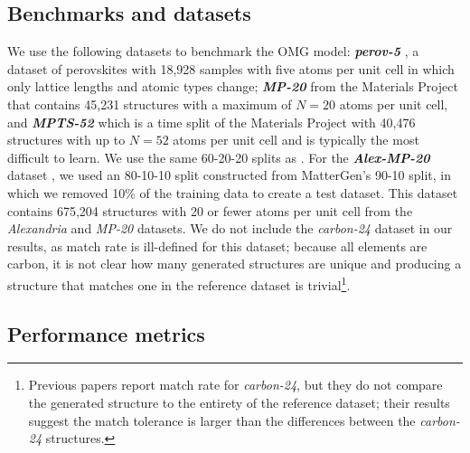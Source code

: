 

\subsection{Benchmarks and datasets}\label{sec:benchmarks}

We use the following datasets to benchmark the OMG model: \textbf{\textit{perov-5}} \citep{castelli_new_2012}, a dataset of perovskites with 18,928 samples with five atoms per unit cell in which only lattice lengths and atomic types change; \textbf{\textit{MP-20}} \citep{jain_commentary_2013, xie_crystal_2022} from the Materials Project that contains 45,231 structures with a maximum of $N=20$ atoms per unit cell, and \mbox{\textbf{\textit{MPTS-52}}} \citep{baird_matbenchgenmetrics_2024} which is a time split of the Materials Project with 40,476 structures with up to $N=52$ atoms per unit cell and is typically the most difficult to learn.
We use the same 60-20-20 splits as \citet{xie_crystal_2022, jiao_crystal_2023, miller_flowmm_2024}.
For the \textbf{\textit{Alex-MP-20}} dataset \citep{zeni_generative_2025}, we used an 80-10-10 split constructed from MatterGen's 90-10 split, in which we removed 10\% of the training data to create a test dataset. This dataset contains 675,204 structures with 20 or fewer atoms per unit cell from the \textit{Alexandria} \citep{schmidt_largescale_2022, schmidt_dataset_2022} and \textit{MP-20} datasets.
We do not include the \textit{carbon-24} dataset \citep{carbon_data_2020} in our results, as match rate is ill-defined for this dataset; because all elements are carbon, it is not clear how many generated structures are unique and producing a structure that matches one in the reference dataset is trivial\footnote{Previous papers \citep{xie_crystal_2022, jiao_crystal_2023, miller_flowmm_2024} report match rate for \textit{carbon-24}, but they do not compare the generated structure to the entirety of the reference dataset; their results suggest the match tolerance is larger than the differences between the \textit{carbon-24} structures.}.

\subsection{Performance metrics}

